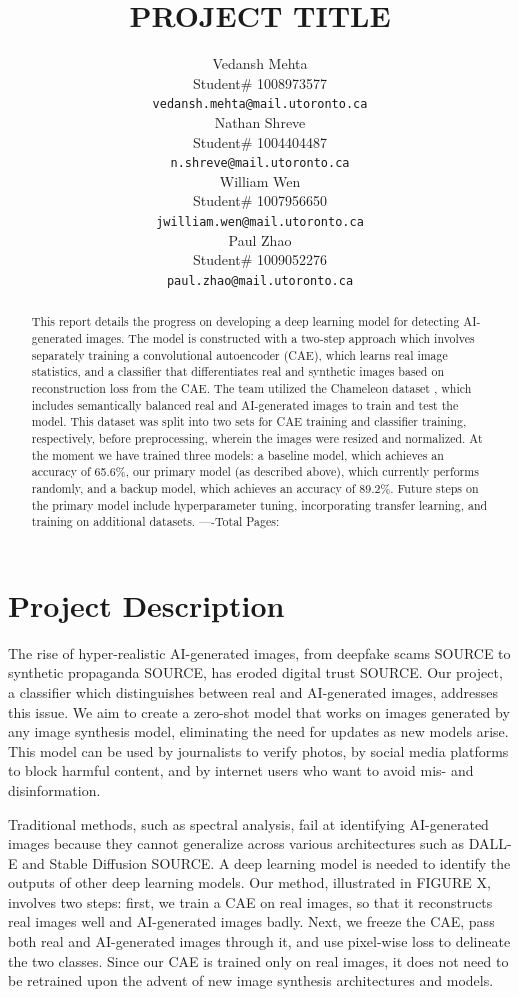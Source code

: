 \documentclass{article} %
\title{PROJECT TITLE}
\author{Vedansh Mehta  \\
Student\# 1008973577 \\
\texttt{vedansh.mehta@mail.utoronto.ca} \\
\And
Nathan Shreve  \\
Student\# 1004404487 \\
\texttt{n.shreve@mail.utoronto.ca} \\
\AND
William Wen  \\
Student\# 1007956650 \\
\texttt{jwilliam.wen@mail.utoronto.ca} \\
\And
Paul Zhao \\
Student\# 1009052276 \\
\texttt{paul.zhao@mail.utoronto.ca} \\
\AND
}
\begin{document}
\maketitle

\begin{abstract}
    This report details the progress on developing a deep learning model for detecting AI-generated images. The model is constructed with a two-step approach which involves separately training a convolutional autoencoder (CAE), which learns real image statistics, and a classifier that differentiates real and synthetic images based on reconstruction loss from the CAE. The team utilized the Chameleon dataset \citep{yan2024sanity}, which includes semantically balanced real and AI-generated images to train and test the model. This dataset was split into two sets for CAE training and classifier training, respectively, before preprocessing, wherein the images were resized and normalized. At the moment we have trained three models: a baseline model, which achieves an accuracy of 65.6\%, our primary model (as described above), which currently performs randomly, and a backup model, which achieves an accuracy of 89.2\%. Future steps on the primary model include hyperparameter tuning, incorporating transfer learning, and training on additional datasets.
    ----Total Pages: \pageref{last_page}
\end{abstract}



\section{Project Description}

The rise of hyper-realistic AI-generated images, from deepfake scams SOURCE to synthetic propaganda SOURCE, has eroded digital trust SOURCE. Our project, a classifier which distinguishes between real and AI-generated images, addresses this issue. We aim to create a zero-shot model that works on images generated by any image synthesis model, eliminating the need for updates as new models arise. This model can be used by journalists to verify photos, by social media platforms to block harmful content, and by internet users who want to avoid mis- and disinformation.


Traditional methods, such as spectral analysis, fail at identifying AI-generated images because they cannot generalize across various architectures such as DALL-E and Stable Diffusion SOURCE. A deep learning model is needed to identify the outputs of other deep learning models. Our method, illustrated in FIGURE X, involves two steps: first, we train a CAE on real images, so that it reconstructs real images well and AI-generated images badly. Next, we freeze the CAE, pass both real and AI-generated images through it, and use pixel-wise loss to delineate the two classes. Since our CAE is trained only on real images, it does not need to be retrained upon the advent of new image synthesis architectures and models.
\end{document}
